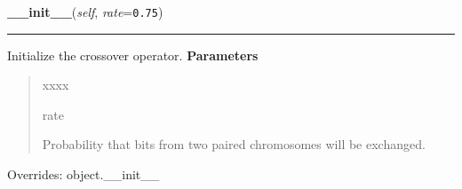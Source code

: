 \hspace{.8\funcindent}\begin{boxedminipage}{\funcwidth}

    \raggedright \textbf{\_\_init\_\_}(\textit{self}, \textit{rate}={\tt 0.75})

    \vspace{-1.5ex}

    \rule{\textwidth}{0.5\fboxrule}
\setlength{\parskip}{2ex}

Initialize the crossover operator.
\setlength{\parskip}{1ex}
      \textbf{Parameters}
      \vspace{-1ex}

      \begin{quote}
        \begin{Ventry}{xxxx}

          \item[rate]


Probability that bits from two paired chromosomes will be exchanged.
        \end{Ventry}

      \end{quote}

      Overrides: object.\_\_init\_\_

    \end{boxedminipage}

    \label{peach:ga:crossover:Uniform:__call__}

    \vspace{0.5ex}

